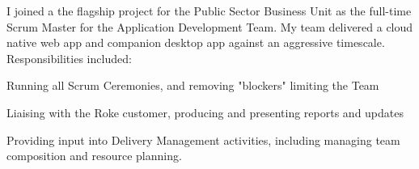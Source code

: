 {}
I joined a the flagship project for the Public Sector Business Unit as the full-time Scrum Master for the Application Development Team.
My team delivered a cloud native web app and companion desktop app against an aggressive timescale.
Responsibilities included:
\vspace{0.25em}
\begin{tightemize}
  \item Running all Scrum Ceremonies, and removing "blockers" limiting the Team
  \item Liaising with the Roke customer, producing and presenting reports and updates
  \item Providing input into Delivery Management activities, including managing team composition and resource planning.
\end{tightemize}
\sectionsep
